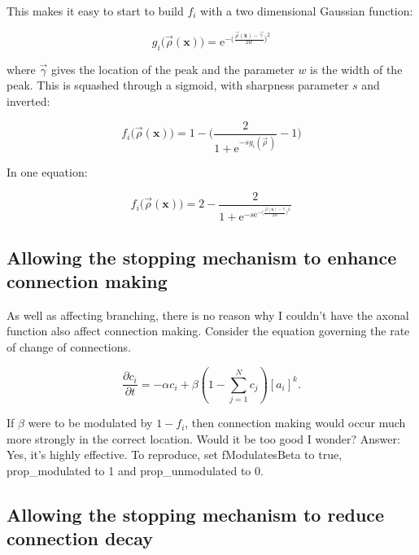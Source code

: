 \documentclass[11pt, a4paper]{article}
\newcommand{\mb}[1]{\mathbf{#1}} %
\begin{document}
This makes it easy to start to build $f_i$ with a two dimensional Gaussian
function:

\begin{equation}\label{eq:g}
g_i\big(\vec{\rho}(\mb{x})\big) = \mathrm{e}^{-\big(\frac{\vec{\rho}(\mb{x})-\vec{\gamma}}{2 w}\big)^2 }
\end{equation}

where $\vec{\gamma}$ gives the location of the peak and the parameter $w$ is
the width of the peak. This is squashed through a sigmoid, with
sharpness parameter $s$ and inverted:

\begin{equation}\label{eq:f}
f_i\big(\vec{\rho}(\mb{x})\big) = 1 - \bigg( \frac{2}{1 + \mathrm{e}^{-s
g_i(\vec{\rho}\,)}} - 1 \bigg)
\end{equation}

In one equation:

\begin{equation}\label{eq:gf}
f_i\big(\vec{\rho}(\mb{x})\big) = 2 - \frac{2}{1
+ \mathrm{e}^{-s \mathrm{e}^{-\big(\frac{\vec{\rho}(\mb{x})-\vec{\gamma}}{2 w}\big)^2 } }}
\end{equation}

\subsection{Allowing the stopping mechanism to enhance connection making}

As well as affecting branching, there is no reason why I couldn't have the
axonal function also affect connection making. Consider the equation governing
the rate of change of connections.

\begin{equation} \label{eq:dc}
\frac{\partial c_i}{\partial t} =-\alpha c_i +\beta  \left(1 - \sum_{j=1}^{N} c_{j}\right)[a_i]^k.
\end{equation}

If $\beta$ were to be modulated by $1 - f_i$, then connection making would
occur much more strongly in the correct location. Would it be too good I
wonder? Answer: Yes, it's highly effective. To reproduce, set fModulatesBeta
to true, prop\_modulated to 1 and prop\_unmodulated to 0.

\subsection{Allowing the stopping mechanism to reduce connection decay}
\end{document}
